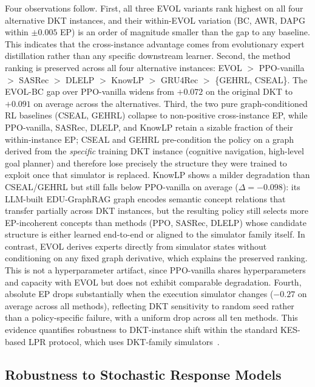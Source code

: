 \documentclass[sigconf,anonymous]{acmart}
\newcommand{\ours}{\textrm{EVOL}}
\begin{document}
Four observations follow. First, all three \ours{} variants rank highest on all four alternative DKT instances, and their within-\ours{} variation (BC, AWR, DAPG within $\pm 0.005$ EP) is an order of magnitude smaller than the gap to any baseline. This indicates that the cross-instance advantage comes from evolutionary expert distillation rather than any specific downstream learner. Second, the method ranking is preserved across all four alternative instances: \ours{} $>$ PPO-vanilla $>$ SASRec $>$ DLELP $>$ KnowLP $>$ GRU4Rec $>$ \{GEHRL, CSEAL\}. The \ours{}-BC gap over PPO-vanilla widens from $+0.072$ on the original DKT to $+0.091$ on average across the alternatives. Third, the two pure graph-conditioned RL baselines (CSEAL, GEHRL) collapse to non-positive cross-instance EP, while PPO-vanilla, SASRec, DLELP, and KnowLP retain a sizable fraction of their within-instance EP; CSEAL and GEHRL pre-condition the policy on a graph derived from the \emph{specific} training DKT instance (cognitive navigation, high-level goal planner) and therefore lose precisely the structure they were trained to exploit once that simulator is replaced. KnowLP shows a milder degradation than CSEAL/GEHRL but still falls below PPO-vanilla on average ($\Delta = -0.098$): its LLM-built EDU-GraphRAG graph encodes semantic concept relations that transfer partially across DKT instances, but the resulting policy still selects more EP-incoherent concepts than methods (PPO, SASRec, DLELP) whose candidate structure is either learned end-to-end or aligned to the simulator family itself. In contrast, \ours{} derives experts directly from simulator states without conditioning on any fixed graph derivative, which explains the preserved ranking. This is not a hyperparameter artifact, since PPO-vanilla shares hyperparameters and capacity with \ours{} but does not exhibit comparable degradation. Fourth, absolute EP drops substantially when the execution simulator changes ($-0.27$ on average across all methods), reflecting DKT sensitivity to random seed rather than a policy-specific failure, with a uniform drop across all ten methods. This evidence quantifies robustness to DKT-instance shift within the standard KES-based LPR protocol, which uses DKT-family simulators~\cite{liu2019cseal,li2023gehrl,cheng2025knowlp}.

\subsection{Robustness to Stochastic Response Models}
\label{sec:stochastic}
\end{document}
